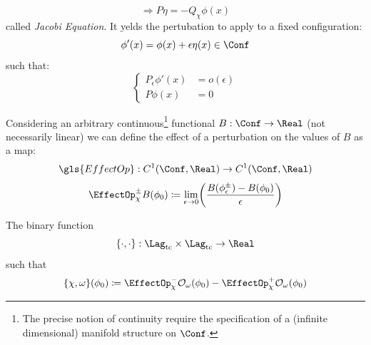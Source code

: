 \documentclass[a4paper,10pt]{report}
\begin{document}
	\begin{definition}
		\begin{equation}\label{PeierlJacobiEqLin}
			\Rightarrow P \eta = - Q_\chi \phi(x)
		\end{equation}
		called \emph{Jacobi Equation}.
		It yelds the pertubation to apply to a fixed configuration:
		\begin{displaymath}
			\phi'(x) = \phi(x) + \epsilon \eta(x) \in \Conf
		\end{displaymath}
		such that:
		\begin{displaymath}
			\begin{cases}
				P_\epsilon \phi'(x) &= o(\epsilon)  \\
				P \phi(x) &= 0
			\end{cases}
		\end{displaymath}
	\end{definition}

	\begin{definition}
		Considering an arbitrary continuous\footnote{The precise notion of continuity require the specification of a (infinite dimensional) manifold structure on $\Conf$.} functional $B: \Conf \rightarrow \Real$ (not necessarily linear) we can define the effect of a perturbation on the values of $B$\cite[pag. 5]{Marolf1993} as a map:
		\begin{displaymath}
			\gls{EffectOp} : C^1(\Conf,\Real) \rightarrow C^1(\Conf,\Real)
		\end{displaymath}
		\begin{equation}\label{EffectOperator}
			\EffectOp_\chi^\pm B ( \phi_0)
			\coloneqq \lim_{\epsilon \rightarrow 0}
			\biggr( \frac{B(\phi_\epsilon^\pm) - B (\phi_0)}{\epsilon} \biggr)
		\end{equation}
	\end{definition}

	\begin{definition}
 		The binary function
		\begin{displaymath}
			\{\cdot,\cdot\}:\Lag_{\textrm{tc}} \times \Lag_{\textrm{tc}} \rightarrow \Real 	
		\end{displaymath}
		such that
		\begin{equation}\label{AbstractPeierlsBracket}
				\{\chi, \omega \}(\phi_0) \coloneqq \EffectOp_\chi^- \mathcal{O}_\omega (\phi_0) - \EffectOp_\chi^+ \mathcal{O}_\omega(\phi_0)
		\end{equation}	
	\end{definition}
	
\end{document}
